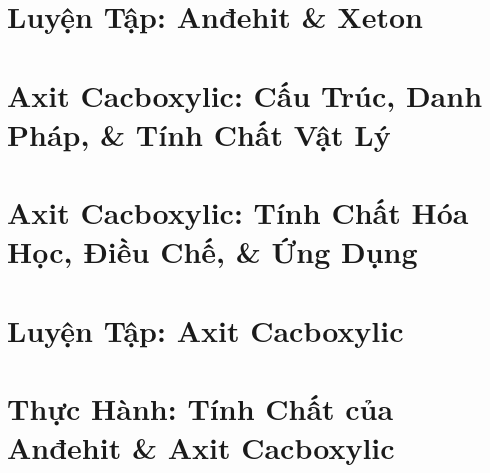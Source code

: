\documentclass[oneside]{book}
\numberwithin{equation}{section}
\begin{document}

\section{Luyện Tập: Anđehit \& Xeton}


\section{Axit Cacboxylic: Cấu Trúc, Danh Pháp, \& Tính Chất Vật Lý}


\section{Axit Cacboxylic: Tính Chất Hóa Học, Điều Chế, \& Ứng Dụng}


\section{Luyện Tập: Axit Cacboxylic}


\section{Thực Hành: Tính Chất của Anđehit \& Axit Cacboxylic}


\printbibliography[heading=bibintoc]
	
\end{document}
